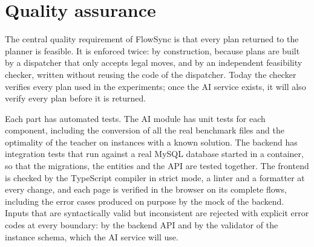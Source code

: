 \section{Quality assurance}
\label{sec:qa}

The central quality requirement of FlowSync is that every plan returned to the planner is
feasible. It is enforced twice: by construction, because plans are built by a dispatcher that
only accepts legal moves, and by an independent feasibility checker, written without reusing the
code of the dispatcher. Today the checker verifies every plan used in the experiments; once the
AI service exists, it will also verify every plan before it is returned.

Each part has automated tests. The AI module has unit tests for each component, including the
conversion of all the real benchmark files and the optimality of the teacher on instances with a
known solution. The backend has integration tests that run against a real MySQL database
started in a container, so that the migrations, the entities and the API are tested together.
The frontend is checked by the TypeScript compiler in strict mode, a linter and a formatter at
every change, and each page is verified in the browser on its complete flows, including the
error cases produced on purpose by the mock of the backend. Inputs that are
syntactically valid but inconsistent are rejected with explicit error codes at every boundary:
by the backend API and by the validator of the instance schema, which the AI service will use.
